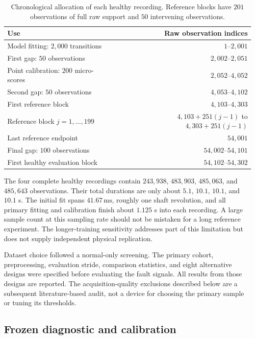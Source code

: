 \documentclass[11pt]{article}
\theoremstyle{definition}
\theoremstyle{remark}
\newcommand{\1}{\mathbf 1}
\begin{document}
\begin{table}[H]
\centering\small
\begin{tabular}{lr}
\toprule
Use & Raw observation indices\\
\midrule
Model fitting: \(2{,}000\) transitions & \(1\)--\(2{,}001\)\\
First gap: \(50\) observations & \(2{,}002\)--\(2{,}051\)\\
Point calibration: \(200\) micro-scores & \(2{,}052\)--\(4{,}052\)\\
Second gap: \(50\) observations & \(4{,}053\)--\(4{,}102\)\\
First reference block & \(4{,}103\)--\(4{,}303\)\\
Reference block \(j=1,\ldots,199\) & \(4{,}103+251(j-1)\) to \(4{,}303+251(j-1)\)\\
Last reference endpoint & \(54{,}001\)\\
Final gap: \(100\) observations & \(54{,}002\)--\(54{,}101\)\\
First healthy evaluation block & \(54{,}102\)--\(54{,}302\)\\
\bottomrule
\end{tabular}
\caption{Chronological allocation of each healthy recording. Reference blocks have \(201\) observations of full raw support and \(50\) intervening observations.}
\label{tab:cwru_allocation}
\end{table}

The four complete healthy recordings contain \(243{,}938\), \(483{,}903\), \(485{,}063\), and \(485{,}643\) observations. Their total durations are only about \(5.1\), \(10.1\), \(10.1\), and \(10.1\) s. The initial fit spans \(41.67\,\mathrm{ms}\), roughly one shaft revolution, and all primary fitting and calibration finish about \(1.125\) s into each recording. A large sample count at this sampling rate should not be mistaken for a long reference experiment. The longer-training sensitivity addresses part of this limitation but does not supply independent physical replication.

Dataset choice followed a normal-only screening. The primary cohort, preprocessing, evaluation stride, comparison statistics, and eight alternative designs were specified before evaluating the fault signals. All results from those designs are reported. The acquisition-quality exclusions described below are a subsequent literature-based audit, not a device for choosing the primary sample or tuning its thresholds.

\clearpage
\subsection{Frozen diagnostic and calibration}
\end{document}
